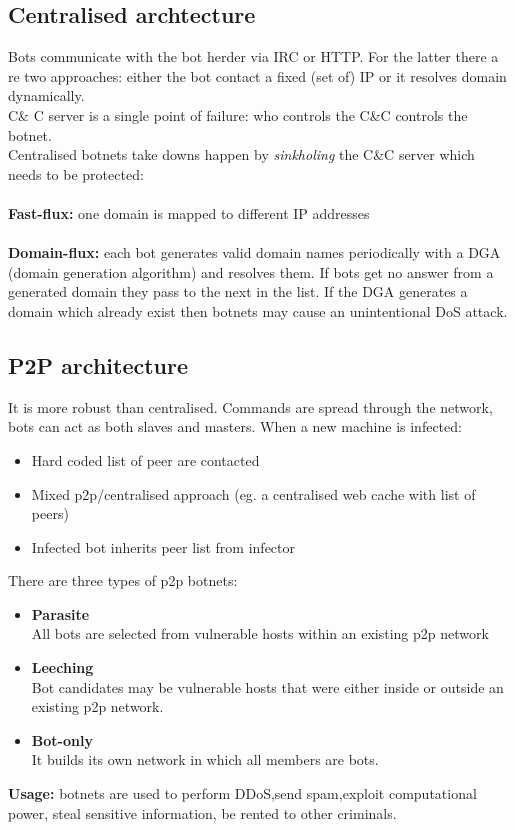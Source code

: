 \documentclass[10pt,a4paper]{book}
\begin{document}
\subsection{Centralised archtecture}
Bots communicate with the bot herder via IRC or HTTP. For the latter there a re two approaches: either the bot contact a fixed (set of) IP or it resolves domain dynamically.\\
C\& C server is a single point of failure: who controls the C\&C controls the botnet.\\
Centralised botnets take downs happen by \emph{sinkholing} the C\&C server which needs to be protected:\\\\
\textbf{Fast-flux:} one domain is mapped to different IP addresses\\\\
\textbf{Domain-flux:} each bot generates valid domain names periodically with a DGA (domain generation algorithm) and resolves them. If bots get no answer from a generated domain they pass to the next in the list. If the DGA generates a domain which already exist then botnets may cause an unintentional DoS attack.
\subsection{P2P architecture}
It is more robust than centralised. Commands are spread through the network, bots can act as both slaves and masters. When a new machine is infected:
\begin{itemize}
\item Hard coded list of peer are contacted
\item Mixed p2p/centralised approach (eg. a centralised web cache with list of peers)
\item Infected bot inherits peer list from infector
\end{itemize}
There are three types of p2p botnets:
\begin{itemize}
\item \textbf{Parasite}\\
All bots are selected from vulnerable hosts within an existing p2p network
\item \textbf{Leeching}\\
Bot candidates may be vulnerable hosts that were either inside or outside an existing p2p network.
\item \textbf{Bot-only}\\
It builds its own network in which all members are bots.
\end{itemize}
\textbf{Usage:} botnets are used to perform DDoS,send spam,exploit computational power, steal sensitive information, be rented to other criminals.
\end{document}
